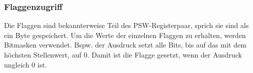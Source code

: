 \subsubsection{Flaggenzugriff}

Die Flaggen sind bekannterweise Teil des PSW-Registerpaar, sprich sie sind als ein Byte gespeichert. Um die Werte der einzelnen Flaggen zu erhalten, werden Bitmasken verwendet. Bspw. der Ausdruck  setzt alle Bits, bis auf das mit dem höchsten Stellenwert, auf 0. Damit ist die Flagge gesetzt, wenn der Ausdruck ungleich 0 ist.
